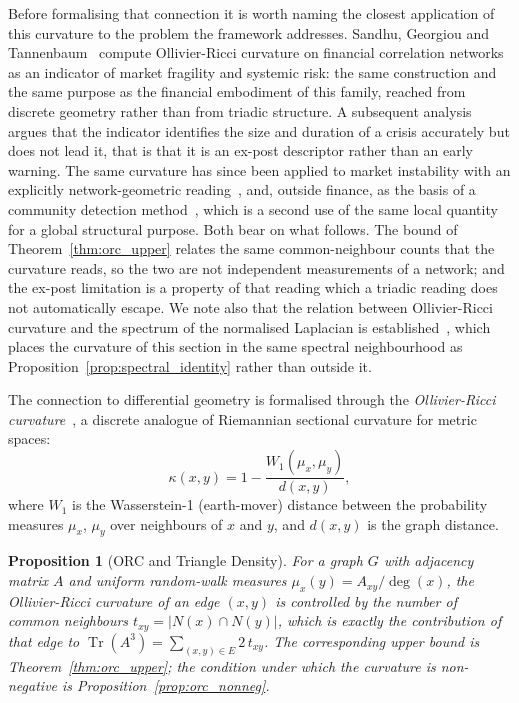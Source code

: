 \documentclass[11pt,a4paper]{article}
\newtheorem{proposition}{Proposition}
\begin{document}
Before formalising that connection it is worth naming the closest
application of this curvature to the problem the framework addresses. Sandhu,
Georgiou and Tannenbaum~\cite{sandhu2016} compute Ollivier-Ricci curvature on
financial correlation networks as an indicator of market fragility and systemic
risk: the same construction and the same purpose as the financial embodiment of
this family, reached from discrete geometry rather than from triadic structure.
A subsequent analysis~\cite{expost2024} argues that the indicator identifies the
size and duration of a crisis accurately but does not lead it, that is that it
is an ex-post descriptor rather than an early warning. The same curvature has
since been applied to market instability with an explicitly network-geometric
reading~\cite{samal2021}, and, outside finance, as the basis of a community
detection method~\cite{sia2019}, which is a second use of the same local
quantity for a global structural purpose. Both bear on what
follows. The bound of Theorem~\ref{thm:orc_upper} relates the same
common-neighbour counts that the curvature reads, so the two are not
independent measurements of a network; and the ex-post limitation is a property
of that reading which a triadic reading does not automatically escape. We note
also that the relation between Ollivier-Ricci curvature and the spectrum of the
normalised Laplacian is established~\cite{bauer2012}, which places the curvature
of this section in the same spectral neighbourhood as
Proposition~\ref{prop:spectral_identity} rather than outside it.

The connection to differential geometry is formalised through the
\emph{Ollivier-Ricci curvature}~\cite{ollivier2009}, a discrete
analogue of Riemannian sectional curvature for metric spaces:
\begin{equation}
\kappa(x, y) = 1 - \frac{W_1(\mu_x, \mu_y)}{d(x,y)},
\label{eq:ricci}
\end{equation}
where $W_1$ is the Wasserstein-1 (earth-mover) distance between
the probability measures $\mu_x$, $\mu_y$ over neighbours of $x$
and $y$, and $d(x,y)$ is the graph distance.

\begin{proposition}[ORC and Triangle Density]
\label{prop:orc_triangles}
For a graph $G$ with adjacency matrix $A$ and uniform random-walk
measures $\mu_x(y) = A_{xy}/\deg(x)$, the Ollivier-Ricci curvature of
an edge $(x,y)$ is controlled by the number of common neighbours
$t_{xy} = |N(x) \cap N(y)|$, which is exactly the contribution of that
edge to $\operatorname{Tr}(A^3) = \sum_{(x,y) \in E} 2\,t_{xy}$. The
corresponding upper bound is Theorem~\ref{thm:orc_upper}; the condition
under which the curvature is non-negative is
Proposition~\ref{prop:orc_nonneg}.
\end{proposition}
\end{document}

